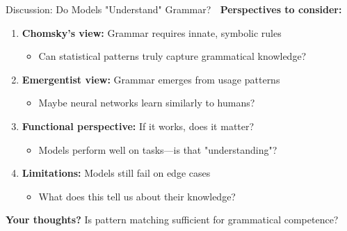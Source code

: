 \documentclass[aspectratio=169]{beamer}
\begin{document}
\begin{frame}[shrink=10]{Discussion: Do Models "Understand" Grammar? 🤔}
    \textbf{Perspectives to consider:}

    \begin{enumerate}\setlength{\itemsep}{0pt}
        \item \textbf{Chomsky's view:} Grammar requires innate, symbolic rules
        \begin{itemize}\setlength{\itemsep}{0pt}
            \item Can statistical patterns truly capture grammatical knowledge?
        \end{itemize}

        \item \textbf{Emergentist view:} Grammar emerges from usage patterns
        \begin{itemize}\setlength{\itemsep}{0pt}
            \item Maybe neural networks learn similarly to humans?
        \end{itemize}

        \item \textbf{Functional perspective:} If it works, does it matter?
        \begin{itemize}\setlength{\itemsep}{0pt}
            \item Models perform well on tasks—is that "understanding"?
        \end{itemize}

        \item \textbf{Limitations:} Models still fail on edge cases
        \begin{itemize}\setlength{\itemsep}{0pt}
            \item What does this tell us about their knowledge?
        \end{itemize}
    \end{enumerate}

    \vspace{0.5em}
    \textbf{Your thoughts?} Is pattern matching sufficient for grammatical competence?
\end{frame}
\end{document}
